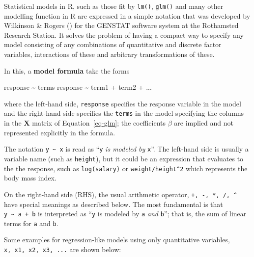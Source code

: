 \documentclass[
  letterpaper,
  10pt,
  krantz2]{krantz}
\makeatletter
\newenvironment{Shaded}{\begin{snugshade}}{\end{snugshade}}
\newcommand{\NormalTok}[1]{\textcolor[rgb]{0.00,0.23,0.31}{#1}}
\newcommand{\SpecialCharTok}[1]{\textcolor[rgb]{0.37,0.37,0.37}{#1}}
\newenvironment{kframe}{%
  \medskip{}
  \setlength{\fboxsep}{.8em}
  \def\at@end@of@kframe{}%
  \ifinner\ifhmode%
  \def\at@end@of@kframe{\end{minipage}}%
  \begin{minipage}{\columnwidth}%
  \fi\fi%
  \def\FrameCommand##1{\hskip\@totalleftmargin \hskip-\fboxsep
  \colorbox{shadecolor}{##1}\hskip-\fboxsep
      \hskip-\linewidth \hskip-\@totalleftmargin \hskip\columnwidth}%
  \MakeFramed {\advance\hsize-\width
    \@totalleftmargin\z@ \linewidth\hsize
    \@setminipage}}%
{\par\unskip\endMakeFramed%
  \at@end@of@kframe}
\renewenvironment{Shaded}{\begin{kframe}}{\end{kframe}}
\makeatother
\begin{document}
Statistical models in R, such as those fit by \texttt{lm()},
\texttt{glm()} and many other modelling function in R are expressed in a
simple notation that was developed by Wilkinson \& Rogers
() for the GENSTAT software
system at the Rothamsted Research Station. It solves the problem of
having a compact way to specify any model consisting of any combinations
of quantitative and discrete factor variables, interactions of these and
arbitrary transformations of these.

In this, a \textbf{model formula} take the forms

\begin{Shaded}
\begin{Highlighting}[]
\NormalTok{response }\SpecialCharTok{\textasciitilde{}}\NormalTok{ terms}
\NormalTok{response }\SpecialCharTok{\textasciitilde{}}\NormalTok{ term1 }\SpecialCharTok{+}\NormalTok{ term2 }\SpecialCharTok{+}\NormalTok{ ...}
\end{Highlighting}
\end{Shaded}

where the left-hand side, \texttt{response} specifies the response
variable in the model and the right-hand side specifies the
\texttt{terms} in the model specifying the columns in the \(\mathbf{X}\)
matrix of Equation~\ref{eq-glm}; the coefficients \(\beta\) are implied
and not represented explicitly in the formula.

The notation \texttt{y\ \textasciitilde{}\ x} is read as ``\texttt{y}
\emph{is modeled by} \texttt{x}''. The left-hand side is usually a
variable name (such as \texttt{height}), but it could be an expression
that evaluates to the the response, such as \texttt{log(salary)} or
\texttt{weight/height\^{}2} which represents the body mass index.

On the right-hand side (RHS), the usual arithmetic operator,
\texttt{+,\ -,\ *,\ /,\ \^{}} have special meanings as described below.
The most fundamental is that \texttt{y\ \textasciitilde{}\ a\ +\ b} is
interpreted as ``\texttt{y} is modeled by \texttt{a} \emph{and}
\texttt{b}''; that is, the sum of linear terms for \texttt{a} and
\texttt{b}.

Some examples for regression-like models using only quantitative
variables, \texttt{x,\ x1,\ x2,\ x3,\ ...} are shown below:
\end{document}

